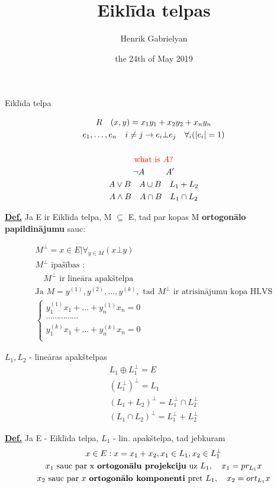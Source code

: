 \documentclass[12pt]{article}
\title{Eiklīda telpas}
\author{Henrik Gabrielyan}
\date{the 24th of May 2019}
\begin{document}
\maketitle

Eiklīda telpa

\begin{gather*}
	R \quad (x,y) = x_1y_1 + x_2y_2 + x_ny_n \\
	e_1, \ldots, e_n \quad i \neq j \rightarrow e_i \bot e_j \quad \forall_i (|e_i| = 1) \\
	\\ \color{red}{\text{what is  } A?} \\
	\neg A  \quad \quad \; \;  A' \\
	A \vee B \quad A \cup B  \quad L_1+L_2 \\	
	A \wedge B \quad A \cap B   \quad  L_1 \cap L_2
\end{gather*}

\textbf{\underline{Def.}}  Ja E ir Eiklīda telpa, M $\subseteq$ E, tad par kopas M \textbf{ortogonālo papildinājumu} sauc:

\begin{gather*}
	M^{\bot} = {x \in E | \forall_{y \in M }(x \bot y)} \\
	M^{\bot} \text{ īpašības :} \\ %
	\quad M^{\bot} \text{ ir lineāra apakštelpa} \\
	\text{Ja } M = y^{(1)}, y^{(2)}, \ldots, y^{(k)},  \text{ tad } M^{\bot} \text{ ir atrisinājumu kopa HLVS} \\
	\begin{cases}
		y_1^{(1)}x_1 + \ldots + y_n^{(1)} x_n = 0 \\
		\cdots \cdots \cdots \cdots \cdots \\
		y_1^{(k)}x_1 + \ldots + y_n^{(k)} x_n = 0 \\
	\end{cases}
\end{gather*}

$L_1, L_2$ - lineāras apakštelpas
\begin{gather*}
	L_1 \oplus L_1^{\bot} = E \\ 
	(L_1^{\bot}) ^ {\bot} = L_1 \\ 
	(L_1 + L_2)^{\bot} = L_1^{\bot} \cap L_2^{\bot} \\
	(L_1 \cap L_2)^{\bot} = L_1^{\bot} +  L_2^{\bot}
\end{gather*}


\textbf{\underline{Def.}}  Ja E - Eiklīda telpa, $L_1$ - lin. apakštelpa, tad jebkuram 
\begin{gather*}
	x \in E: x = x_1 + x_2, x_1 \in L_1, x_2 \in L_1^{\bot} \\
	x_1 \text{ sauc par x \textbf{ortogonālu projekciju} uz } L_1, \quad x_1 = pr_{L_1}x \\
	x_2 \text{ sauc par } x \text{  \textbf{ortogonālo komponenti} pret } L_1,  \quad x_2 = ort_{L_1}x
\end{gather*}
\end{document}
